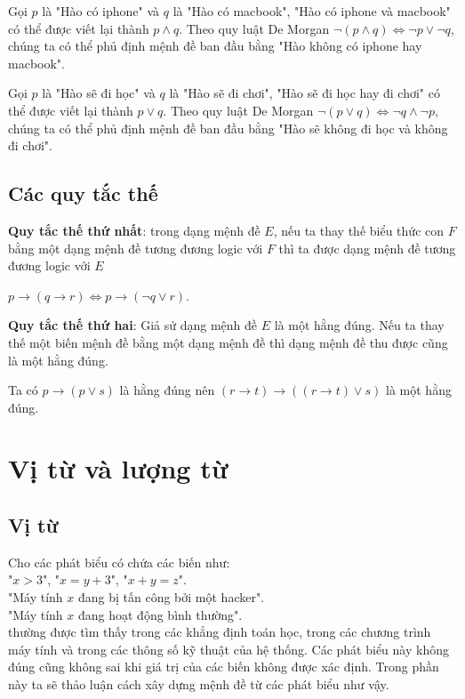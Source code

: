 \documentclass[11pt,fleqn]{book} %
\begin{document}
        Gọi $p$ là "Hào có iphone" và $q$ là "Hào có macbook", "Hào có iphone và macbook" có thể được viết lại thành $p \land q$. Theo quy luật De Morgan $\neg (p \land q) \Leftrightarrow \neg p \lor \neg q$, chúng ta có thể phủ định mệnh đề ban đầu bằng "Hào không có iphone hay macbook".
            
        Gọi $p$ là "Hào sẽ đi học" và $q$ là "Hào sẽ đi chơi", "Hào sẽ đi học hay đi chơi" có thể được viết lại thành $p \lor q$. Theo quy luật De Morgan $\neg (p \lor q) \Leftrightarrow \neg q \land \neg p$, chúng ta có thể phủ định mệnh đề ban đầu bằng "Hào sẽ không đi học và không đi chơi".
    
    \subsection{Các quy tắc thế}
    
        \begin{theorem}
            \textbf{Quy tắc thế thứ nhất}: trong dạng mệnh đề $E$, nếu ta thay thế biểu thức con $F$ bằng một dạng mệnh đề tương đương logic với $F$ thì ta được dạng mệnh đề tương đương logic với $E$
        \end{theorem}
        
        \begin{example}
            $p \to (q \to r) \Leftrightarrow p \to (\neg q \lor r)$.
        \end{example}
        
        \begin{theorem}
            \textbf{Quy tắc thế thứ hai}: Giả sử dạng mệnh đề $E$ là một hằng đúng. Nếu ta thay thế một biến mệnh đề bằng một dạng mệnh đề thì dạng mệnh đề thu được cũng là một hằng đúng.
        \end{theorem}
        
        \begin{example}
            Ta có $p \to (p \lor s)$ là hằng đúng nên $(r \to t) \to ((r \to t) \lor s)$ là một hằng đúng.
        \end{example}
        
    \section{Vị từ và lượng từ}
    \subsection{Vị từ}
        Cho các phát biểu có chứa các biến như:\\
        "$x > 3$", "$x = y + 3$", "$x + y = z$".\\
        "Máy tính $x$ đang bị tấn công bởi một hacker".\\
        "Máy tính $x$ đang hoạt động bình thường".\\
        thường được tìm thấy trong các khẳng định toán học, trong các chương trình máy tính và trong các thông số kỹ thuật của hệ thống. Các phát biểu này không đúng cũng không sai khi giá trị của các biến không được xác định. Trong phần này ta sẽ thảo luận cách xây dựng mệnh đề từ các phát biểu như vậy.
        
\end{document}
